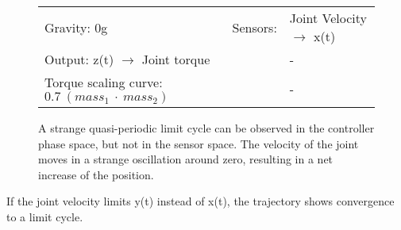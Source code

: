 \documentclass[main]{subfiles}
\begin{document}
\begin{figure}[H]
	\centering
	\begin{minipage}{1.3\textwidth}
	\hspace*{-5em}
	\end{minipage}
	\caption[Joint Velocity \(\rightarrow\) x(t) limited chaotic controller controlling model leg]{A strange quasi-periodic limit cycle can be observed in the controller phase space, but not in the sensor space. The velocity of the joint moves in a strange oscillation around zero, resulting in a net increase of the position.}
	\begin{tabular}{l|ll}
	\hline 
	Gravity: 0g  & Sensors: & Joint Velocity \(\rightarrow\) x(t)\\
	 Output: z(t) \(\rightarrow\) Joint torque & & - \\
	  Torque scaling curve: \(0.7~(mass_1~\cdot~mass_2)\) & & - \\
	  \hline
	\end{tabular}
	\label{figure:limited-model-leg3}
\end{figure}

If the joint velocity limits y(t) instead of x(t), the trajectory shows convergence to a limit cycle.
\end{document}
